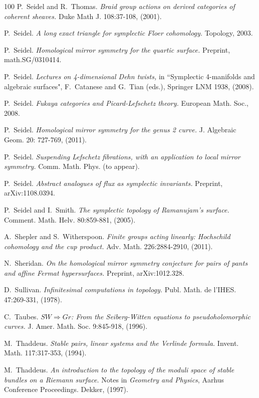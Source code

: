 \documentclass[reqno,10pt]{amsart}
\numberwithin{equation}{section}
\theoremstyle{remark}
\begin{document}
\begin{thebibliography}{100}
P.~Seidel and R.~Thomas.
\emph{Braid group actions on derived categories of coherent sheaves.}
Duke Math J. 108:37-108, (2001).

P.~Seidel.
\emph{A long exact triangle for symplectic Floer cohomology.}
Topology, 2003.

P.~Seidel.
\emph{Homological mirror symmetry for the quartic surface.}
Preprint, math.SG/0310414.

P.~Seidel.
\emph{Lectures on 4-dimensional Dehn twists,} in ``Symplectic 4-manifolds and algebraic surfaces", F.~Catanese and G.~Tian (eds.),  Springer LNM 1938, (2008).

P.~Seidel.
\emph{Fukaya categories and Picard-Lefschetz theory.}
European Math. Soc., 2008.

P.~Seidel.
\emph{Homological mirror symmetry for the genus 2 curve.}
J. Algebraic Geom. 20: 727-769, (2011).

P.~Seidel.
\emph{Suspending Lefschetz fibrations, with an application to local mirror symmetry.}
Comm. Math. Phys. (to appear).

P.~Seidel.
\emph{Abstract analogues of flux as symplectic invariants.}
Preprint, arXiv:1108.0394.

P.~Seidel and I.~Smith.
\emph{The symplectic topology of Ramanujam's surface.}
Comment. Math. Helv. 80:859-881, (2005).


A.~Shepler and S.~Witherspoon.
\emph{Finite groups acting linearly: Hochschild cohomology and the cup product.}
Adv. Math. 226:2884-2910, (2011).

N.~Sheridan.
\emph{On the homological mirror symmetry conjecture for pairs of pants and affine Fermat hypersurfaces.}
Preprint, arXiv:1012.328.

D.~Sullivan.
\emph{Infinitesimal computations in topology.}
Publ. Math. de l'IHES. 47:269-331, (1978).


C.~Taubes.
\emph{$SW\Rightarrow Gr$: From the Seiberg-Witten equations to pseudoholomorphic curves.}
J. Amer. Math. Soc. 9:845-918, (1996).

M.~Thaddeus.
\emph{Stable pairs, linear systems and the Verlinde formula.}
Invent. Math. 117:317-353, (1994).

M.~Thaddeus.
\emph{An introduction to the topology of the moduli space of stable bundles on a Riemann surface.}
Notes in \emph{Geometry and Physics}, Aarhus Conference Proceedings. Dekker, (1997).



\end{thebibliography}
\end{document}
